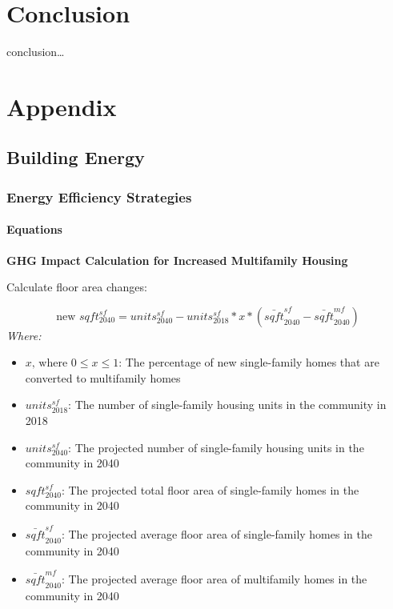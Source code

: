 \documentclass[
]{book}
\providecommand{\tightlist}{%
  \setlength{\itemsep}{0pt}\setlength{\parskip}{0pt}}
\begin{document}
\hypertarget{conclusion}{%
\chapter{Conclusion}\label{conclusion}}

conclusion\ldots{}

\hypertarget{appendix}{%
\chapter*{Appendix}\label{appendix}}

\hypertarget{building-energy-1}{%
\section{Building Energy}\label{building-energy-1}}

\hypertarget{energy-efficiency-strategies}{%
\subsection{Energy Efficiency Strategies}\label{energy-efficiency-strategies}}

\hypertarget{equations}{%
\subsubsection{Equations}\label{equations}}

\textbf{GHG Impact Calculation for Increased Multifamily Housing}

Calculate floor area changes:

\[ \text{new }sqft_{2040}^{sf} = units_{2040}^{sf} - units_{2018}^{sf} * x * (\bar{sqft}_{2040}^{sf} - \bar{sqft}_{2040}^{mf})\]
\emph{Where:}

\begin{itemize}
\tightlist
\item
  \(x\text{, where } 0 \le x \le 1\): The percentage of new single-family homes that are converted to multifamily homes
\item
  \(units_{2018}^{sf}\): The number of single-family housing units in the community in 2018
\item
  \(units_{2040}^{sf}\): The projected number of single-family housing units in the community in 2040
\item
  \(sqft_{2040}^{sf}\): The projected total floor area of single-family homes in the community in 2040
\item
  \(\bar{sqft}_{2040}^{sf}\): The projected average floor area of single-family homes in the community in 2040
\item
  \(\bar{sqft}_{2040}^{mf}\): The projected average floor area of multifamily homes in the community in 2040
\end{itemize}
\end{document}
